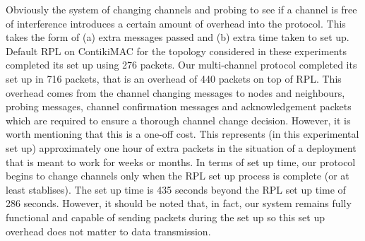 


Obviously the system of changing channels and probing to see if a channel is free of interference introduces a certain amount of overhead into
the protocol.  This takes the form of (a) extra messages passed and (b) extra time taken to set up.  Default RPL on ContikiMAC for the topology considered in these experiments completed its set up using 276 packets.  Our multi-channel protocol completed its set up in 716 packets, that is an overhead of 440 packets on top of RPL. 
This overhead comes from the channel changing messages to nodes and neighbours, probing messages, channel confirmation messages and acknowledgement packets which are required to ensure a thorough channel change decision.
However, it is worth mentioning that this is a one-off cost.  This represents (in this experimental set up) approximately one hour of extra packets in the situation of a deployment that is meant to work for weeks or months.  In terms of set up time, our protocol begins to change channels only when the RPL set up process is complete (or at least stablises).  The set up time is 435 seconds beyond the 
RPL set up time of 286 seconds.  However, it should be noted that, in fact, our system remains fully functional and capable of sending packets during
the set up so this set up overhead does not matter to data transmission.
